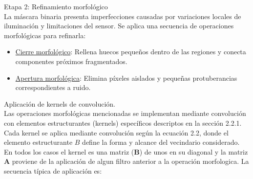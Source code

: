 Etapa 2: Refinamiento morfológico\\
\noindent
La máscara binaria presenta imperfecciones causadas por variaciones locales de iluminación y limitaciones del sensor. Se aplica una secuencia de operaciones morfológicas para refinarla:

\begin{itemize}[label=$\bullet$]
    \item \underline{Cierre morfológico}: Rellena huecos pequeños dentro de las regiones y conecta componentes próximos fragmentados.
    \item \underline{Apertura morfológica}: Elimina píxeles aislados y pequeñas protuberancias correspondientes a ruido.
\end{itemize}

Aplicación de kernels de convolución.\\
\noindent
Las operaciones morfológicas mencionadas se implementan mediante convolución con elementos estructurantes (kernels) específicos descriptos en la sección 2.2.1.\\ %

Cada kernel se aplica mediante convolución según la ecuación 2.2, donde el elemento estructurante $B$ define la forma y alcance del vecindario considerado. En todos los casos el kernel es una matriz (\textbf{B}) de unos en su diagonal y la matriz \textbf{A} proviene de la aplicación de algun filtro anterior a la operación morfologica. La secuencia típica de aplicación es:%

